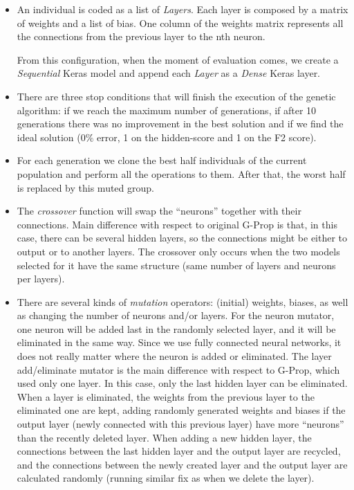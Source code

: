 \documentclass[runningheads]{llncs}
\begin{document}
\begin{itemize}

  \item An individual is coded as a list of \emph{Layers}. Each layer is
    composed by a matrix of weights and a list of bias. One column of the
    weights matrix represents all the connections from the previous layer to the
    nth neuron.

    From this configuration, when the moment of evaluation comes, we create a
    \emph{Sequential} \cite{keras-sequential}  Keras \cite{keras-nn} model and
    append each \emph{Layer} as a \emph{Dense} \cite{keras-dense} Keras layer.

  \item There are three stop conditions that will finish the execution of the
    genetic algorithm: if we reach the maximum number of generations, if after
    10 generations there was no improvement in the best solution and if we find
    the ideal solution ($0\%$ error, 1 on the hidden-score and 1 on the F2
    score).

  \item For each generation we clone the best half individuals of the current
    population and perform all the operations to them. After that, the worst
    half is replaced by this muted group.

  \item The {\em crossover} function will swap the ``neurons'' together with
    their connections. Main difference with respect to original G-Prop is that,
    in this case, there can be several hidden layers, so the connections might
    be either to output or to another layers. The crossover only occurs when
    the two models selected for it have the same structure (same number of
    layers and neurons per layers).


  \item There are several kinds of {\em mutation} operators: (initial) weights,
    biases, as well as changing the number of neurons and/or
    layers. For the neuron mutator, one neuron will be added last in the
    randomly selected layer, and it will be eliminated in the same way. Since
    we use fully connected neural networks, it does not really matter where the
    neuron is added or eliminated. The layer add/eliminate mutator is the
    main difference with respect to G-Prop, which used only one
    layer. In this case, only the last hidden layer can be eliminated. When a
    layer is eliminated, the weights from the previous layer to the eliminated
    one are kept, adding randomly generated weights and biases if the output
    layer (newly connected with this previous layer) have more ``neurons'' than
    the recently deleted layer. When adding a new hidden layer, the connections
    between the last hidden layer and the output layer are recycled, and the
    connections between the newly created layer and the output layer are
    calculated randomly (running similar fix as when we delete the layer).


\end{itemize}
\end{document}
